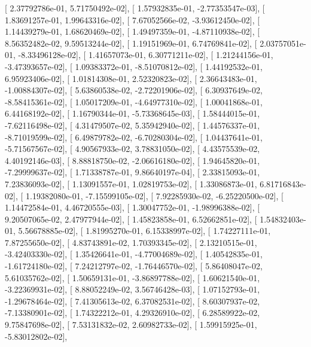 \documentclass{article}
\begin{document}
       [  2.37792786e-01,   5.71750492e-02],
       [  1.57932835e-01,  -2.77353547e-03],
       [  1.83691257e-01,   1.99643316e-02],
       [  7.67052566e-02,  -3.93612450e-02],
       [  1.14439279e-01,   1.68620469e-02],
       [  1.49497359e-01,  -4.87110938e-02],
       [  8.56352482e-02,   9.59513244e-02],
       [  1.19151969e-01,   6.74769841e-02],
       [  2.03757051e-01,  -8.33496128e-02],
       [  1.41657073e-01,   6.30771211e-02],
       [  1.21244156e-01,  -3.47393657e-02],
       [  1.09383372e-01,  -8.51070812e-02],
       [  1.44192532e-01,   6.95923406e-02],
       [  1.01814308e-01,   2.52320823e-02],
       [  2.36643483e-01,  -1.00884307e-02],
       [  5.63860538e-02,  -2.72201906e-02],
       [  6.30937649e-02,  -8.58415361e-02],
       [  1.05017209e-01,  -4.64977310e-02],
       [  1.00041868e-01,   6.44168192e-02],
       [  1.16790344e-01,  -5.73368645e-03],
       [  1.58444015e-01,  -7.62116498e-02],
       [  4.31479507e-02,   5.35942940e-02],
       [  1.44576337e-01,  -8.71019599e-02],
       [  6.49879782e-02,  -6.70280304e-02],
       [  1.04437641e-01,  -5.71567567e-02],
       [  4.90567933e-02,   3.78831050e-02],
       [  4.43575539e-02,   4.40192146e-03],
       [  8.88818750e-02,  -2.06616180e-02],
       [  1.94645820e-01,  -7.29999637e-02],
       [  1.71338787e-01,   9.86640197e-04],
       [  2.33815093e-01,   7.23836093e-02],
       [  1.13091557e-01,   1.02819753e-02],
       [  1.33086873e-01,   6.81716843e-02],
       [  1.19382080e-01,  -7.15599105e-02],
       [  7.92285930e-02,  -6.25220500e-02],
       [  1.14472584e-01,   4.46720555e-03],
       [  1.30047752e-01,  -1.98996388e-02],
       [  9.20507065e-02,   2.47977944e-02],
       [  1.45823858e-01,   6.52662851e-02],
       [  1.54832403e-01,   5.56678885e-02],
       [  1.81995270e-01,   6.15338997e-02],
       [  1.74227111e-01,   7.87255650e-02],
       [  4.83743891e-02,   1.70393345e-02],
       [  2.13210515e-01,  -3.42403330e-02],
       [  1.35426641e-01,  -4.77004689e-02],
       [  1.40542835e-01,  -1.61724180e-02],
       [  7.24212797e-02,  -1.76446570e-02],
       [  5.86408047e-02,   5.61035762e-02],
       [  1.50659131e-01,  -3.86897788e-02],
       [  1.60621540e-01,  -3.22369931e-02],
       [  8.88052249e-02,   3.56746428e-03],
       [  1.07152793e-01,  -1.29678464e-02],
       [  7.41305613e-02,   6.37082531e-02],
       [  8.60307937e-02,  -7.13380901e-02],
       [  1.74322212e-01,   4.29326910e-02],
       [  6.28589922e-02,   9.75847698e-02],
       [  7.53131832e-02,   2.60982733e-02],
       [  1.59915925e-01,  -5.83012802e-02],
\end{document}
